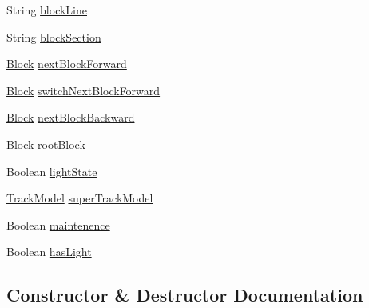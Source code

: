 \begin{DoxyCompactItemize}
\item 
String \hyperlink{classTrackModel_1_1Block_a04e22a2597bed95ae3ed8f723b63de94}{block\+Line}
\item 
String \hyperlink{classTrackModel_1_1Block_a2adc620752945c54ae212bc4b6043975}{block\+Section}
\item 
\hyperlink{classTrackModel_1_1Block}{Block} \hyperlink{classTrackModel_1_1Block_acd730e762fcf625825d4939bc38b2672}{next\+Block\+Forward}
\item 
\hyperlink{classTrackModel_1_1Block}{Block} \hyperlink{classTrackModel_1_1Block_a8a7d15ff05ed0c3a56e34c27c06dd99a}{switch\+Next\+Block\+Forward}
\item 
\hyperlink{classTrackModel_1_1Block}{Block} \hyperlink{classTrackModel_1_1Block_a267092cfc33a1a5b06d61e605aa16da5}{next\+Block\+Backward}
\item 
\hyperlink{classTrackModel_1_1Block}{Block} \hyperlink{classTrackModel_1_1Block_a400d119c96231f6cf5db4accbf48cb84}{root\+Block}
\item 
Boolean \hyperlink{classTrackModel_1_1Block_ae2a73faa62ffb87e3a70e72c6bdec27d}{light\+State}
\item 
\hyperlink{classTrackModel_1_1TrackModel}{Track\+Model} \hyperlink{classTrackModel_1_1Block_a62ba712491f00e90cc279365a693f00f}{super\+Track\+Model}
\item 
Boolean \hyperlink{classTrackModel_1_1Block_a2a4f17aa957073179dd40a0fb5343fbc}{maintenence}
\item 
Boolean \hyperlink{classTrackModel_1_1Block_a1cfc614674d2e3ddc91aae595d8c2f83}{has\+Light}
\end{DoxyCompactItemize}


\subsection{Constructor \& Destructor Documentation}
\mbox{\label{classTrackModel_1_1Block_a016adcf378ac0c1738bd95a4db52f913}} 
